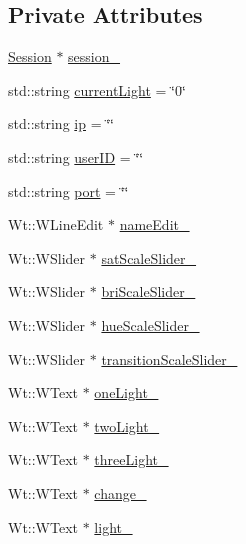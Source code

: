 \subsection*{Private Attributes}
\begin{DoxyCompactItemize}
\item 
\hyperlink{classSession}{Session} $\ast$ \hyperlink{classLightsControlWidget_ad27e600149ef3590947a491470dcb4c8}{session\+\_\+}
\item 
std\+::string \hyperlink{classLightsControlWidget_ace513933420460bc8fbb508d865491d4}{current\+Light} = \char`\"{}0\char`\"{}
\item 
std\+::string \hyperlink{classLightsControlWidget_aa2855e24d3d1afbcf6fcd2992abc47af}{ip} = \char`\"{}\char`\"{}
\item 
std\+::string \hyperlink{classLightsControlWidget_aa26d4553e677dec57b64575a6d6d8558}{user\+ID} = \char`\"{}\char`\"{}
\item 
std\+::string \hyperlink{classLightsControlWidget_a5760f7ec7c3c36e8faf00ae6b2633ab5}{port} = \char`\"{}\char`\"{}
\item 
Wt\+::\+W\+Line\+Edit $\ast$ \hyperlink{classLightsControlWidget_aff7b495c562df75a6006ad6bef43f96f}{name\+Edit\+\_\+}
\item 
Wt\+::\+W\+Slider $\ast$ \hyperlink{classLightsControlWidget_af957447fbfc39f4f0c87081be5cf2bf5}{sat\+Scale\+Slider\+\_\+}
\item 
Wt\+::\+W\+Slider $\ast$ \hyperlink{classLightsControlWidget_aafc30b2cc242d6ac2575128a491298d3}{bri\+Scale\+Slider\+\_\+}
\item 
Wt\+::\+W\+Slider $\ast$ \hyperlink{classLightsControlWidget_a71c03598de2481409316e7d1ca51fda0}{hue\+Scale\+Slider\+\_\+}
\item 
Wt\+::\+W\+Slider $\ast$ \hyperlink{classLightsControlWidget_af4bd66ddc5244ab9cf62dea9e5ffb1cf}{transition\+Scale\+Slider\+\_\+}
\item 
Wt\+::\+W\+Text $\ast$ \hyperlink{classLightsControlWidget_a5d33dac9a47a7862e6cc060e1e0fb335}{one\+Light\+\_\+}
\item 
Wt\+::\+W\+Text $\ast$ \hyperlink{classLightsControlWidget_a1148be7db38088bb15fc356e06e13b65}{two\+Light\+\_\+}
\item 
Wt\+::\+W\+Text $\ast$ \hyperlink{classLightsControlWidget_a82b1ded41fd126f7f4e041ab5b0b7ccb}{three\+Light\+\_\+}
\item 
Wt\+::\+W\+Text $\ast$ \hyperlink{classLightsControlWidget_a27b0c91e6a4776c8b03dfc5324e3e365}{change\+\_\+}
\item 
Wt\+::\+W\+Text $\ast$ \hyperlink{classLightsControlWidget_a071eae068aef8f47a36e728ae3ad6378}{light\+\_\+}
\end{DoxyCompactItemize}


